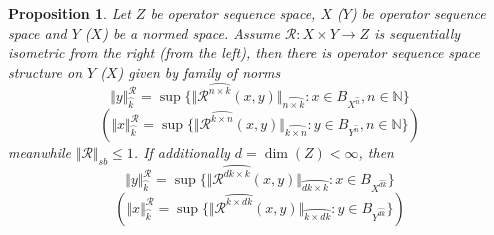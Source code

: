 \documentclass[12pt]{article}
\newtheorem{proposition}[theorem]{Proposition}
\begin{document}
\begin{proposition}\label{PrSQNormViaDuality}
Let $Z$ be operator sequence space, $X$ ($Y$) be operator sequence space and 
$Y$ ($X$) be a normed space. Assume $\mathcal{R}:X\times Y\to Z$ is sequentially 
isometric from the right (from the left), then 
there is operator sequence space structure on $Y$ ($X$) given by family of norms
$$
\Vert
y\Vert_{\wideparen{k}}^{\mathcal{R}}=\sup \{\Vert\mathcal{R}^{\wideparen{n\times
k}}(x,y)\Vert_{\wideparen{n\times k}}:x\in B_{X^{\wideparen{n}}},
n\in\mathbb{N} \}
$$
$$
(\Vert
x\Vert_{\wideparen{k}}^{\mathcal{R}}=\sup \{\Vert\mathcal{R}^{\wideparen{k\times
n}}(x,y)\Vert_{\wideparen{k\times n}}:y\in B_{Y^{\wideparen{n}}},
n\in\mathbb{N} \})
$$
meanwhile $\Vert \mathcal{R}\Vert_{sb}\leq 1$. 
If additionally $d=\dim(Z)<\infty$, then
$$
\Vert
y\Vert_{\wideparen{k}}^{\mathcal{R}}=
\sup \{
    \Vert
        \mathcal{R}^{\wideparen{dk\times k}}(x,y)
    \Vert_{\wideparen{dk\times k}}
    :x\in B_{X^{\wideparen{dk}}} 
 \}
$$
$$
(\Vert x\Vert_{\wideparen{k}}^{\mathcal{R}}
=\sup \{
    \Vert
        \mathcal{R}^{\wideparen{k\times dk}}(x,y)
    \Vert_{\wideparen{k\times dk}}
    :y\in B_{Y^{\wideparen{dk}}} 
 \})
$$
\end{proposition}
\end{document}
